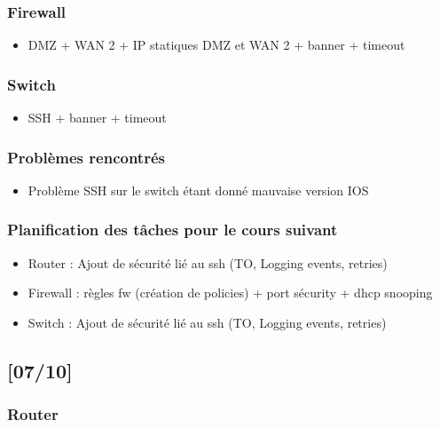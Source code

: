 \documentclass[a4paper,12pt]{article}
\begin{document}
\subsubsection{Firewall}


\begin{itemize}

\item DMZ + WAN 2 + IP statiques DMZ et WAN 2 + banner + timeout
\end{itemize} 

\subsubsection{Switch}

\begin{itemize}

\item SSH + banner + timeout
\end{itemize} 

\subsubsection{Problèmes rencontrés}
\begin{itemize}

\item Problème SSH sur le switch étant donné mauvaise version IOS

\end{itemize} 

\subsubsection{Planification des tâches pour le cours suivant}
\begin{itemize}


\item Router : Ajout de sécurité lié au ssh (TO, Logging events, retries)
\item Firewall : règles fw (création de policies) + port sécurity + dhcp snooping
\item Switch : Ajout de sécurité lié au ssh (TO, Logging events, retries)
\end{itemize} 

\newpage
\subsection{[07/10]}

\subsubsection{Router}
\end{document}
